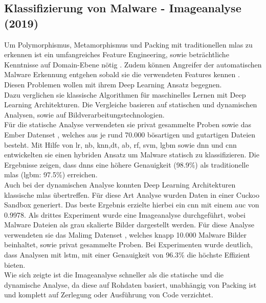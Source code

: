 \documentclass[
    12pt, %
    DIV10,
    ngerman, %
    a4paper, %
    oneside, %
    titlepage, %
    parskip=half, %
    headings=normal, %
    listof=totoc, %
    bibliography=totoc, %
    index=totoc, %
    captions=tableheading, %
    final %
]{scrreprt}
\begin{document}
\subsection{Klassifizierung von Malware - Imageanalyse (2019)}\label{ember}
Um Polymorphismus, Metamorphismus und Packing mit traditionellen \ac{mlas} zu erkennen ist ein umfangreiches Feature Engineering, sowie beträchtliche Kenntnisse auf Domain-Ebene nötig \parencite{rhode2018early}. Zudem können Angreifer der automatischen Malware Erkennung entgehen sobald sie die verwendeten Features kennen \parencite{anderson2017evading}. Diesen Problemen wollen \textcite{Vinayakumar2019} mit ihrem Deep Learning Ansatz begegnen.\\
Dazu verglichen sie klassische Algorithmen für maschinelles Lernen mit Deep Learning Architekturen. Die Vergleiche basieren auf statischen und dynamischen Analysen, sowie auf Bildverarbeitungstechnologien.\\
Für die statische Analyse verwendeten sie privat gesammelte Proben sowie das Ember Datenset \parencite{anderson2018ember}, welches aus je rund 70.000 bösartigen und gutartigen Dateien besteht. Mit Hilfe von \ac{lr}, \ac{nb}, \ac{knn},\ac{dt}, \ac{ab}, \ac{rf}, \ac{svm}, \ac{lgbm} sowie \ac{dnn} und \ac{cnn} entwickelten sie einen hybriden Ansatz um Malware statisch zu klassifizieren. Die Ergebnisse zeigen, dass \ac{dnns} eine höhere Genauigkeit (98.9\%) als traditionelle \ac{mlas} (\ac{lgbm}: 97.5\%) erreichen.\\
Auch bei der dynamischen Analyse  konnten Deep Learning Architekturen klassische \ac{mlas} übertreffen. Für diese Art Analyse wurden Daten in einer Cuckoo Sandbox generiert. Das beste Ergebnis erzielte hierbei ein \ac{cnn} mit einem \ac{auc} von 0.9978.
Als drittes Experiment wurde eine Imageanalyse durchgeführt, wobei Malware Dateien als grau skalierte Bilder dargestellt werden. Für diese Analyse verwendeten sie das Malimg Datenset \parencite{nataraj2011malware}, welches knapp 10.000 Malware Bilder beinhaltet, sowie privat gesammelte Proben. Bei Experimenten wurde deutlich, dass Analysen mit \ac{lstm}, mit einer Genauigkeit von 96.3\% die höchste Effizient bieten.\\
Wie sich zeigte ist die Imageanalyse schneller als die statische und die dynamische Analyse, da diese auf Rohdaten basiert, unabhängig von Packing ist und komplett auf Zerlegung oder Ausführung von Code verzichtet. 
\end{document}
